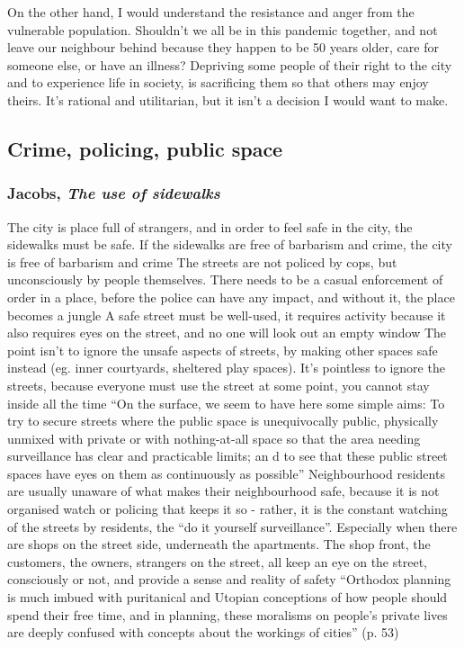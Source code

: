 \documentclass{article}
\begin{document}
\begin{outline}
On the other hand, I would understand the resistance and anger from the vulnerable population. Shouldn't we all be in this pandemic together, and not leave our neighbour behind because they happen to be 50 years older, care for someone else, or have an illness? Depriving some people of their right to the city and to experience life in society, is sacrificing them so that others may enjoy theirs. It's rational and utilitarian, but it isn't a decision I would want to make.
\end{outline}

\subsection{Crime, policing, public space}

\subsubsection{Jacobs, \textit{The use of sidewalks}}

\begin{outline}
	\1 The city is place full of strangers, and in order to feel safe in the city, the sidewalks must be safe. If the sidewalks are free of barbarism and crime, the city is free of barbarism and crime
	\1 The streets are not policed by cops, but unconsciously by people themselves. There needs to be a casual enforcement of order in a place, before the police can have any impact, and without it, the place becomes a jungle
	\1 A safe street must be well-used, it requires activity because it also requires eyes on the street, and no one will look out an empty window
	\1 The point isn't to ignore the unsafe aspects of streets, by making other spaces safe instead (eg. inner courtyards, sheltered play spaces). It's pointless to ignore the streets, because everyone must use the street at some point, you cannot stay inside all the time
	\1 ``On the surface, we seem to have here some simple aims: To try to secure streets where the public space is unequivocally public, physically unmixed with private or with nothing-at-all space so that the area needing surveillance has clear and practicable limits; an d to see that these public street spaces have eyes on them as continuously as possible''
	\1 Neighbourhood residents are usually unaware of what makes their neighbourhood safe, because it is not organised watch or policing that keeps it so - rather, it is the constant watching of the streets by residents, the ``do it yourself surveillance''. Especially when there are shops on the street side, underneath the apartments. The shop front, the customers, the owners, strangers on the street, all keep an eye on the street, consciously or not, and provide a sense and reality of safety
	\1 ``Orthodox planning is much imbued with puritanical and Utopian conceptions of how people should spend their free time, and in planning, these moralisms on people's private lives are deeply confused with concepts about the workings of cities'' (p. 53)
	\1 
\end{outline}
\end{document}
